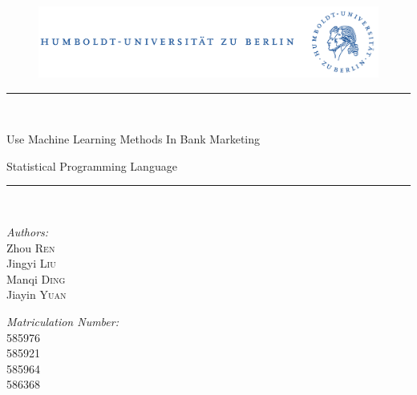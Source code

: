 \begin{titlepage}

\begin{center}


\begin{figure}

\includegraphics[scale=0.7]{hukombi_bwb.pdf}\\   

\end{figure}





\newcommand{\HRule}{\rule{\linewidth}{0.5mm}}
\HRule \\[0.02cm]
{ \huge \bfseries \begin{onehalfspace}
Use Machine Learning Methods In Bank Marketing
\end{onehalfspace}}

{ \large \bfseries \begin{onehalfspace}
Statistical Programming Language
\end{onehalfspace}}

\HRule \\[0.8cm]


\begin{minipage}{0.4\textwidth}
\begin{flushleft} \large
\emph{Authors:}\\
Zhou \textsc{Ren}\\
Jingyi \textsc{Liu}\\
Manqi \textsc{Ding}\\
Jiayin \textsc{Yuan}
\end{flushleft}
\end{minipage}
\hfill
\begin{minipage}{0.5\textwidth}
\begin{flushright} \large
\emph{Matriculation Number:} \\
585976\\
585921\\
585964\\
586368
\end{flushright}
\end{minipage}\\[1cm]


\end{center}
\end{titlepage}
